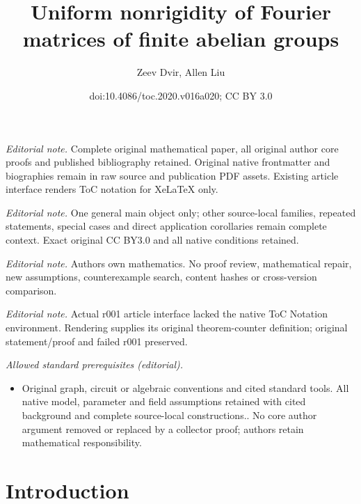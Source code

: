 \documentclass[11pt]{article}
\title{Uniform nonrigidity of Fourier matrices of finite abelian groups}
\author{Zeev Dvir, Allen Liu}
\date{doi:10.4086/toc.2020.v016a020; CC BY 3.0}
\numberwithin{equation}{section}
\theoremstyle{definition}
\theoremstyle{plain}
\theoremstyle{definition}
\begin{document}
\maketitle
\noindent\textit{Editorial note.} Complete original mathematical paper, all original author core proofs and published bibliography retained. Original native frontmatter and biographies remain in raw source and publication PDF assets. Existing article interface renders ToC notation for XeLaTeX only.\par\medskip
\noindent\textit{Editorial note.} One general main object only; other source-local families, repeated statements, special cases and direct application corollaries remain complete context. Exact original CC BY3.0 and all native conditions retained.\par\medskip
\noindent\textit{Editorial note.} Authors own mathematics. No proof review, mathematical repair, new assumptions, counterexample search, content hashes or cross-version comparison.\par\medskip
\noindent\textit{Editorial note.} Actual r001 article interface lacked the native ToC Notation environment. Rendering supplies its original theorem-counter definition; original statement/proof and failed r001 preserved.\par\medskip
\noindent\textit{Allowed standard prerequisites (editorial).}\begin{itemize}
\item Original graph, circuit or algebraic conventions and cited standard tools. All native model, parameter and field assumptions retained with cited background and complete source-local constructions.. No core author argument removed or replaced by a collector proof; authors retain mathematical responsibility.
\end{itemize}\medskip
\section{Introduction}
\end{document}
